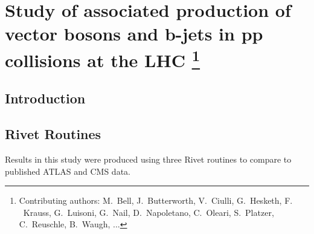 \documentclass[11pt]{cernrep} \usepackage{graphicx,epsfig} 
\begin{document}
\section{Study of associated production of vector bosons and b-jets in
  pp collisions at the LHC \protect\footnote{Contributing authors:
    M.~Bell, J.~Butterworth,  V.~Ciulli,
    G.~Hesketh, F. ~Krauss, G.~Luisoni, G.~Nail, D.~Napoletano,
    C.~Oleari, S.~Platzer, C.~Reuschle, B.~Waugh, ... }}

\subsection{Introduction}



\subsection{Rivet Routines}

Results in this study were produced using three Rivet routines to compare to published ATLAS and CMS data.
\end{document}
